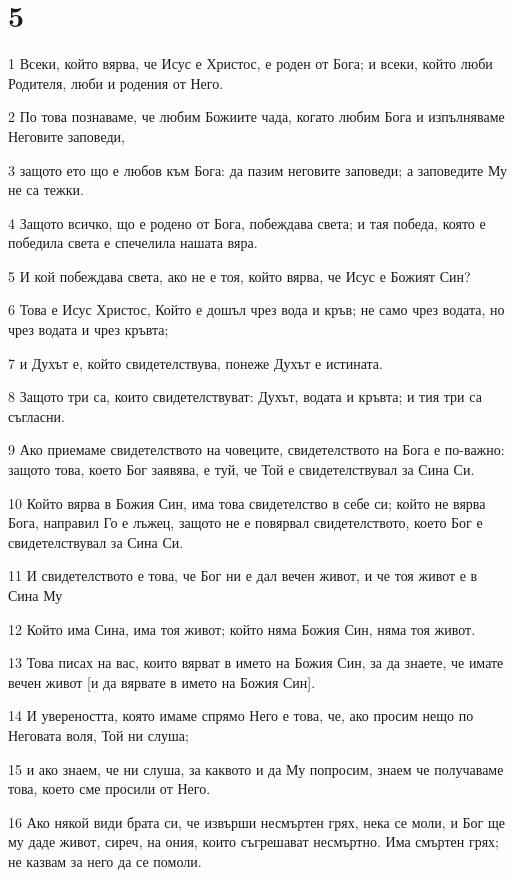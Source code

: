\chapter{5}

\par 1 Всеки, който вярва, че Исус е Христос, е роден от Бога; и всеки, който люби Родителя, люби и родения от Него.
\par 2 По това познаваме, че любим Божиите чада, когато любим Бога и изпълняваме Неговите заповеди,
\par 3 защото ето що е любов към Бога: да пазим неговите заповеди; а заповедите Му не са тежки.
\par 4 Защото всичко, що е родено от Бога, побеждава света; и тая победа, която е победила света е спечелила нашата вяра.
\par 5 И кой побеждава света, ако не е тоя, който вярва, че Исус е Божият Син?
\par 6 Това е Исус Христос, Който е дошъл чрез вода и кръв; не само чрез водата, но чрез водата и чрез кръвта;
\par 7 и Духът е, който свидетелствува, понеже Духът е истината.
\par 8 Защото три са, които свидетелствуват: Духът, водата и кръвта; и тия три са съгласни.
\par 9 Ако приемаме свидетелството на човеците, свидетелството на Бога е по-важно: защото това, което Бог заявява, е туй, че Той е свидетелствувал за Сина Си.
\par 10 Който вярва в Божия Син, има това свидетелство в себе си; който не вярва Бога, направил Го е лъжец, защото не е повярвал свидетелството, което Бог е свидетелствувал за Сина Си.
\par 11 И свидетелството е това, че Бог ни е дал вечен живот, и че тоя живот е в Сина Му
\par 12 Който има Сина, има тоя живот; който няма Божия Син, няма тоя живот.
\par 13 Това писах на вас, които вярват в името на Божия Син, за да знаете, че имате вечен живот [и да вярвате в името на Божия Син].
\par 14 И увереността, която имаме спрямо Него е това, че, ако просим нещо по Неговата воля, Той ни слуша;
\par 15 и ако знаем, че ни слуша, за каквото и да Му попросим, знаем че получаваме това, което сме просили от Него.
\par 16 Ако някой види брата си, че извърши несмъртен грях, нека се моли, и Бог ще му даде живот, сиреч, на ония, които съгрешават несмъртно. Има смъртен грях; не казвам за него да се помоли.
